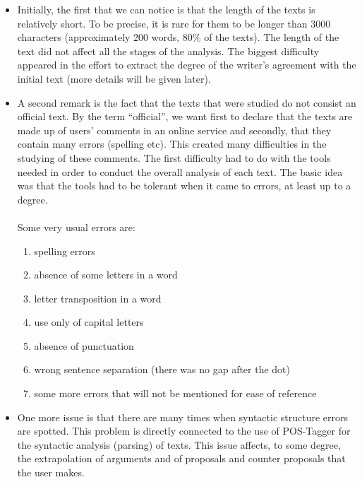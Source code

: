 \begin{itemize}
  \item Initially, the first that we can notice is that the length of the texts is 	relatively short. To be precise, it is rare for them to be longer than 3000 characters (approximately 200 words, 80\% of the texts). The length of the text did not affect all the stages of the analysis. The biggest difficulty appeared in the effort to extract the degree of the writer's agreement with the initial text (more details will be given later).\\
  
  \item A second remark is the fact that the texts that were studied do not consist an official text. By the term ``official'', we want first to declare that the texts are made up of users' comments in an online service and secondly, that they contain many errors (spelling etc). This created many difficulties in the studying of these comments. The first difficulty had to do with the tools needed in order to conduct the overall analysis of each text. The basic idea was that the tools had to be tolerant when it came to errors, at least up to a degree.\\
\\
Some very usual errors are:

  	\begin{enumerate}
  	\item spelling errors
  	\item absence of some letters in a word
  	\item letter transposition in a word
  	\item use only of capital letters
  	\item absence of punctuation
  	\item wrong sentence separation (there was no gap after the dot)
  	\item some more errors that will not be mentioned for ease of reference\\
	\end{enumerate}

  \item One more issue is  that there are many times when syntactic structure errors are 	spotted. This problem is directly connected to the use of POS-Tagger for the syntactic analysis (parsing) of texts. This issue affects, to some degree, the extrapolation of arguments and of proposals and counter proposals that the user makes.\\
  

\end{itemize}
